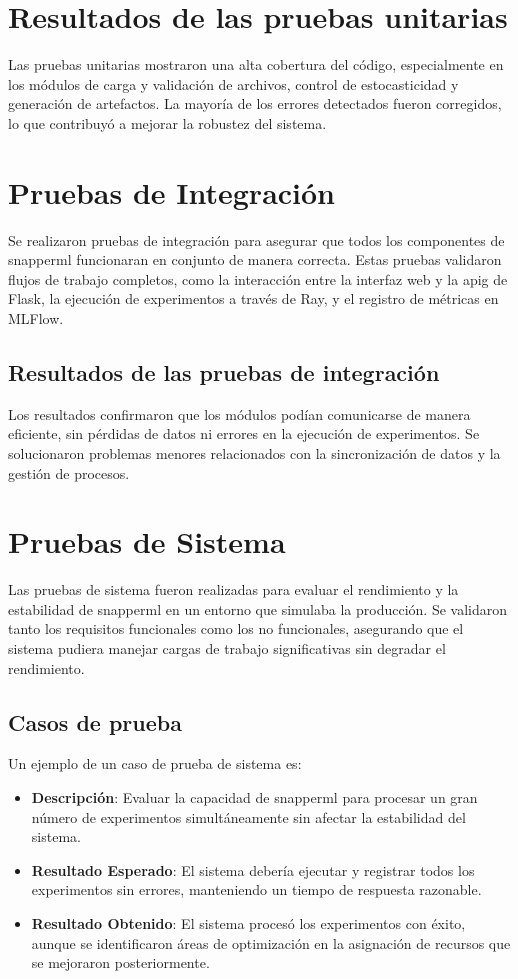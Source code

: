 \section{Resultados de las pruebas unitarias}
Las pruebas unitarias mostraron una alta cobertura del código, especialmente en los módulos de carga y validación de archivos, control de estocasticidad y generación de artefactos. La mayoría de los errores detectados fueron corregidos, lo que contribuyó a mejorar la robustez del sistema.

\section{Pruebas de Integración}
Se realizaron pruebas de integración para asegurar que todos los componentes de \Gls{snapperml} funcionaran en conjunto de manera correcta. Estas pruebas validaron flujos de trabajo completos, como la interacción entre la interfaz web y la \Gls{apig} de Flask, la ejecución de experimentos a través de Ray, y el registro de métricas en MLFlow.

\subsection{Resultados de las pruebas de integración}
Los resultados confirmaron que los módulos podían comunicarse de manera eficiente, sin pérdidas de datos ni errores en la ejecución de experimentos. Se solucionaron problemas menores relacionados con la sincronización de datos y la gestión de procesos.

\section{Pruebas de Sistema}
Las pruebas de sistema fueron realizadas para evaluar el rendimiento y la estabilidad de \Gls{snapperml} en un entorno que simulaba la producción. Se validaron tanto los requisitos funcionales como los no funcionales, asegurando que el sistema pudiera manejar cargas de trabajo significativas sin degradar el rendimiento.

\subsection{Casos de prueba}
Un ejemplo de un caso de prueba de sistema es:

\begin{itemize} \item \textbf{Descripción}: Evaluar la capacidad de \Gls{snapperml} para procesar un gran número de experimentos simultáneamente sin afectar la estabilidad del sistema.
    \item \textbf{Resultado Esperado}: El sistema debería ejecutar y registrar todos los experimentos sin errores, manteniendo un tiempo de respuesta razonable.
    \item \textbf{Resultado Obtenido}: El sistema procesó los experimentos con éxito, aunque se identificaron áreas de optimización en la asignación de recursos que se mejoraron posteriormente.
\end{itemize}

